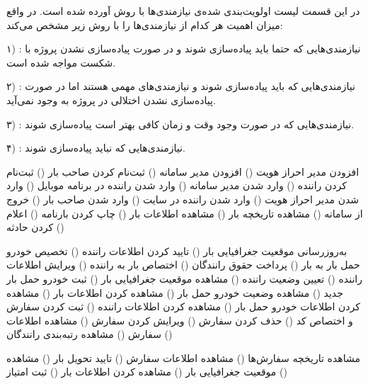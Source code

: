 
در این قسمت لیست اولویت‌بندی شده‌ی نیازمندی‌ها با روش  آورده شده است. در واقع  میزان اهمیت هر کدام از نیازمندی‌ها را با روش زیر مشخص می‌کند:

۱) : نیازمندی‌هایی که حتما باید پیاده‌سازی شوند و در صورت پیاده‌سازی نشدن پروژه با شکست مواجه شده است.

۲) : نیازمندی‌هایی که باید پیاده‌سازی شوند و نیازمندی‌های مهمی هستند اما در صورت پیاده‌سازی نشدن اختلالی در پروژه به وجود نمی‌آید.

۳) : نیازمندی‌هایی که در صورت وجود وقت و زمان کافی بهتر است پیاده‌سازی شوند.

۴) : نیازمندی‌هایی که نباید پیاده‌سازی شوند.

	 
		 افزودن مدیر احراز هویت ()
		 افزودن مدیر سامانه ()
		 ثبت‌نام کردن صاحب بار ()
		 ثبت‌نام کردن راننده ()
		 وارد شدن مدیر سامانه ()
		 وارد شدن راننده در برنامه موبایل ()
		 وارد شدن مدیر احراز هویت ()
		 وارد شدن راننده در سایت ()
		 وارد شدن صاحب بار ()
		 خروج از سامانه ()
	 
		 مشاهده تاریخچه بار ()
		 مشاهده اطلاعات بار ()
		 چاپ کردن بارنامه ()
		 اعلام کردن حادثه ()
	
	 
		 به‌روزرسانی موقعیت جغرافیایی بار ()
	 
		 تایید کردن اطلاعات راننده ()
		 تخصیص خودرو حمل بار به بار ()
		 پرداخت حقوق رانندگان ()
		 اختصاص بار به راننده ()
		 ویرایش اطلاعات راننده ()
		 تعیین وضعیت راننده		 ()
		 مشاهده موقعیت جغرافیایی بار ()
		 ثبت خودرو حمل بار جدید ()
		 مشاهده وضعیت خودرو حمل بار ()
		 مشاهده کردن اطلاعات بار ()
		 مشاهده کردن اطلاعات خودرو حمل بار ()
		 مشاهده کردن اطلاعات راننده ()
		 ثبت کردن سفارش و اختصاص کد ()
		 حذف کردن سفارش ()
		 ویرایش کردن سفارش ()
		 مشاهده اطلاعات سفارش ()
		 مشاهده رتبه‌بندی رانندگان ()
		
	 
		 مشاهده تاریخچه سفارش‌ها ()
		 مشاهده اطلاعات سفارش ()
		 تایید تحویل بار ()
		 مشاهده موقعیت جغرافیایی بار ()
		 مشاهده کردن اطلاعات بار ()
		 ثبت امتیاز ()

